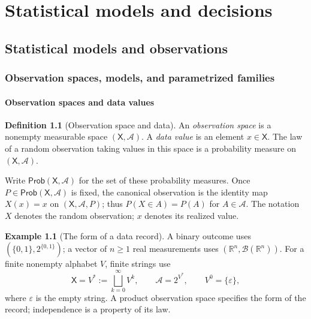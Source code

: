 \documentclass[11pt,oneside]{book}
\theoremstyle{definition}
\newtheorem{definition}[theorem]{Definition}
\newtheorem{example}[theorem]{Example}
\theoremstyle{remark}
\newcommand{\Prob}{\mathsf{Prob}}
\newcommand{\R}{\mathbb R}
\begin{document}
\frontmatter
\tableofcontents
\mainmatter
\part{Statistical models and decisions}
\label{part:statistical-models-decisions}
\chapter{Statistical models and observations}
\label{chap:statistical-models}
\section{Observation spaces, models, and parametrized families}
\label{sec:models-parametrizations}

\subsection{Observation spaces and data values}
\label{subsec:observation-spaces}

\begin{definition}[Observation space and data]
\label{def:observation-space}
An \emph{observation space} is a nonempty measurable space
$(\mathsf X,\mathcal A)$. A \emph{data value} is an element $x\in\mathsf X$.
The law of a random observation taking values in this space is a probability
measure on $(\mathsf X,\mathcal A)$.
\end{definition}

Write $\Prob(\mathsf X,\mathcal A)$ for the set of these probability measures.
Once $P\in\Prob(\mathsf X,\mathcal A)$ is fixed, the canonical observation is
the identity map $X(x)=x$ on $(\mathsf X,\mathcal A,P)$; thus
$P(X\in A)=P(A)$ for $A\in\mathcal A$.
The notation $X$ denotes the random observation; $x$ denotes its realized value.

\begin{example}[The form of a data record]
\label{ex:observation-spaces}
A binary outcome uses $(\{0,1\},2^{\{0,1\}})$; a vector of $n\geq1$ real
measurements uses $(\R^n,\mathcal B(\R^n))$.
For a finite nonempty alphabet $V$, finite strings use
\[
\mathsf X=V^*:=\bigsqcup_{k=0}^{\infty}V^k,\qquad
\mathcal A=2^{V^*},\qquad V^0=\{\varepsilon\},
\]
where $\varepsilon$ is the empty string. A product observation space specifies
the form of the record; independence is a property of its law.
\end{example}
\end{document}

